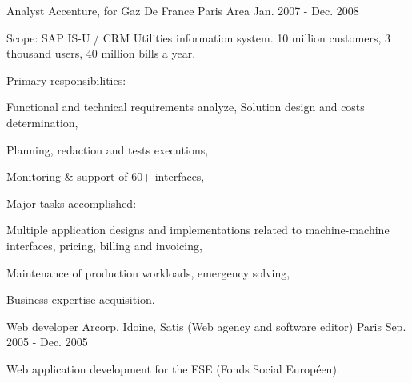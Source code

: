 \begin{cventries}
  \cventry
    {Analyst} %
    {Accenture, for Gaz De France} %
    {Paris Area} %
    {Jan. 2007 - Dec. 2008} %
    {
      \begin{cvitems} %
        \item {Scope: SAP IS-U / CRM Utilities information system. 10 million customers, 3 thousand users, 40 million bills a year.}
        \item {Primary responsibilities:}
        \begin{cvsubitems}
          \item {Functional and technical requirements analyze, Solution design and costs determination,}
          \item {Planning, redaction and tests executions,}
          \item {Monitoring \& support of 60+ interfaces,}
        \end{cvsubitems}
        \item {Major tasks accomplished:}
        \begin{cvsubitems}
          \item {Multiple application designs and implementations related to machine-machine interfaces, pricing, billing and invoicing,}
          \item {Maintenance of production workloads, emergency solving,}
          \item {Business expertise acquisition.}
        \end{cvsubitems}
      \end{cvitems}
    }

  \cventry
    {Web developer} %
    {Arcorp, Idoine, Satis (Web agency and software editor)} %
    {Paris} %
    {Sep. 2005 - Dec. 2005} %
    {
      \begin{cvitems} %
        \item {Web application development for the FSE (Fonds Social Européen).}
      \end{cvitems}
    }

\end{cventries}
